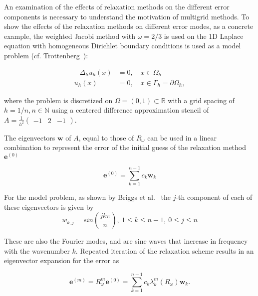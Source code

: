 An examination of the effects of relaxation methods on the different error components is necessary to understand the motivation of multigrid methods. To show the effects of the relaxation methods on different error modes, as a concrete example, the weighted Jacobi method with $\omega = 2/3$ is used on the 1D Laplace equation with homogeneous Dirichlet boundary conditions is used as a model problem (cf. Trottenberg~\cite{Trottenberg2001}):

\begin{equation}
\begin{aligned}
	-\Delta_h u_h(x) &= 0, \quad x \in \Omega_h \\
	u_h(x) &= 0, \quad x \in \Gamma_h = \partial \Omega_h,
\end{aligned}
\label{eq:model_problem}
\end{equation}

where the problem is discretized on $\Omega = (0, 1) \subset \mathbb{R}$ with a grid spacing of $h = 1/n, n \in \mathbb{N}$ using a centered difference approximation stencil of $A = \frac{1}{h^2} \begin{pmatrix} -1 & 2 &-1 \end{pmatrix}$.

The eigenvectors $\mathbf{w}$ of $A$, equal to those of $R_{\omega}$ can be used in a linear combination to represent the error of the initial guess of the relaxation method $\mathbf{e}^{(0)}$

\begin{equation}
	\mathbf{e}^{(0)} = \sum_{k=1}^{n-1}{c_{k}\mathbf{w}_{k}}
\end{equation}

For the model problem, as shown by Briggs et al.~\cite{Briggs2000} the $j$-th component of each of these eigenvectors is given by
\begin{equation}
	w_{k,j} = sin\left(\frac{jk\pi}{n}\right),\ 1 \leq k \leq n-1,\ 0 \leq j \leq n
\end{equation}

These are also the Fourier modes, and are sine waves that increase in frequency with the wavenumber $k$. Repeated iteration of the relaxation scheme results in an eigenvector expansion for the error as

\begin{equation}
	\mathbf{e}^{(m)} = R_{\omega}^m \mathbf{e}^{(0)} = \sum_{k=1}^{n-1}{c_k\lambda_k^m\left( R_{\omega}\right)\mathbf{w}_k}.
\end{equation}

